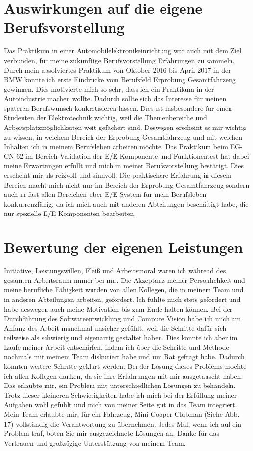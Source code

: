 \documentclass[10pt,a4paper]{report}
\begin{document}
\section{Auswirkungen auf die eigene Berufsvorstellung}
Das Praktikum in einer Automobilelektronikeinrichtung war auch mit dem Ziel verbunden, für meine zukünftige Berufsvorstellung Erfahrungen zu sammeln. Durch mein absolviertes Praktikum von Oktober 2016 bis April 2017 in der BMW konnte ich erste Eindrücke vom Berufsfeld Erprobung Gesamtfahrzeug gewinnen. Dies motivierte mich so sehr, dass ich ein Praktikum in der Autoindustrie machen wollte. Dadurch sollte sich das Interesse für meinen späteren Berufswunsch konkretisieren lassen. Dies ist insbesondere für einen Studenten der Elektrotechnik wichtig, weil die Themenbereiche und Arbeitsplatzmöglichkeiten weit gefächert sind. Deswegen erscheint es mir wichtig zu wissen, in welchem Bereich der Erprobung Gesamtfahrzeug und mit welchen Inhalten ich in meinem Berufsleben arbeiten möchte.
Das Praktikum beim EG-CN-62 im Bereich Validation der E/E Komponente und Funktionentest hat dabei meine Erwartungen erfüllt und mich in meiner Berufsvorstellung bestätigt. Dies erscheint mir als reizvoll und sinnvoll. Die praktischere Erfahrung in diesem Bereich macht mich nicht nur im Bereich der Erprobung Gesamtfahrzeug sondern auch in fast allen Bereichen über E/E System für mein Berufsleben konkurrenzfähig, da ich mich auch mit anderen Abteilungen beschäftigt habe, die nur spezielle E/E Komponenten bearbeiten.


\section{Bewertung der eigenen Leistungen}
 Initiative, Leistungswillen, Fleiß und Arbeitsmoral waren ich während des gesamten Arbeitsraum immer bei mir. Die Akzeptanz meiner Persönlichkeit und meine berufliche Fähigkeit wurden von allen Kollegen, die in meinem Team und in anderen Abteilungen arbeiten, gefördert. Ich fühlte mich stets gefordert und habe deswegen auch meine Motivation bis zum Ende halten können. Bei der Durchführung des Softwareentwicklung und Compute Vision habe ich mich am Anfang des Arbeit manchmal unsicher gefühlt, weil die Schritte dafür sich teilweise als schwierig und eigenartig gestaltet haben. Dies konnte ich aber im Laufe meiner Arbeit entschärfen, indem ich über die Schritte und Methode nochmals mit meinem Team diskutiert habe und um Rat gefragt habe. Dadurch konnten weitere Schritte geklärt werden. Bei der Lösung dieses Problems möchte ich allen Kollegen danken, da sie ihre Erfahrungen mit mir ausgetauscht haben. Das erlaubte mir, ein Problem mit unterschiedlichen Lösungen zu behandeln. Trotz dieser kleineren Schwierigkeiten habe ich mich bei der Erfüllung meiner Aufgaben wohl gefühlt und mich von meiner Seite gut in das Team integriert. Mein Team erlaubte mir, für ein Fahrzeug, Mini Cooper Clubman (Siehe Abb. 17) vollständig die Verantwortung zu übernehmen. Jedes Mal, wenn ich auf ein Problem traf, boten Sie mir ausgezeichnete Lösungen an. Danke für das Vertrauen und großzügige Unterstützung von meinem Team. 
\end{document}
